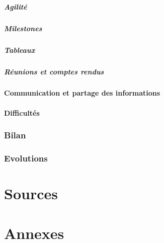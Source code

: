 \documentclass{article}
\begin{document}
\subsubsection{Agilité}

\subsubsection{Milestones}

\subsubsection{Tableaux}

\subsubsection{Réunions et comptes rendus}

\subsection{Communication et partage des informations}

\subsection{Difficultés}

\newpage


\section{Bilan}

\newpage


\section{Evolutions}

\newpage


\part*{Sources}

\newpage


\part*{Annexes}

\newpage
\end{document}
